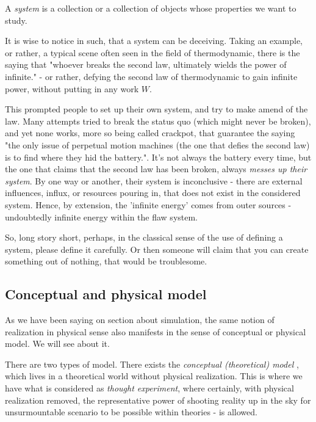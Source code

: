 \begin{definition}[System]
    A \textit{system} is a collection or a collection of objects whose properties we want to study. 
\end{definition}

It is wise to notice in such, that a system can be deceiving. Taking an example, or rather, a typical scene often seen in the field of thermodynamic, there is the saying that "whoever breaks the second law, ultimately wields the power of infinite." - or rather, defying the second law of thermodynamic to gain infinite power, without putting in any work $W$. 

This prompted people to set up their own system, and try to make amend of the law. Many attempts tried to break the status quo (which might never be broken), and yet none works, more so being called crackpot, that guarantee the saying "the only issue of perpetual motion machines (the one that defies the second law) is to find where they hid the battery.". It's not always the battery every time, but the one that claims that the second law has been broken, always \textit{messes up their system}. By one way or another, their system is inconclusive - there are external influences, influx, or resources pouring in, that does not exist in the considered system. Hence, by extension, the 'infinite energy' comes from outer sources - undoubtedly infinite energy within the flaw system. 

So, long story short, perhaps, in the classical sense of the use of defining a system, please define it carefully. Or then someone will claim that you can create something out of nothing, that would be troublesome. 

\subsection{Conceptual and physical model}
As we have been saying on section about simulation, the same notion of realization in physical sense also manifests in the sense of conceptual or physical model. We will see about it. 

There are two types of model. There exists the \textit{conceptual (theoretical) model} , which lives in a theoretical world without physical realization. This is where we have what is considered as \textit{thought experiment}, where certainly, with physical realization removed, the representative power of shooting reality up in the sky for unsurmountable scenario to be possible within theories - is allowed. 

